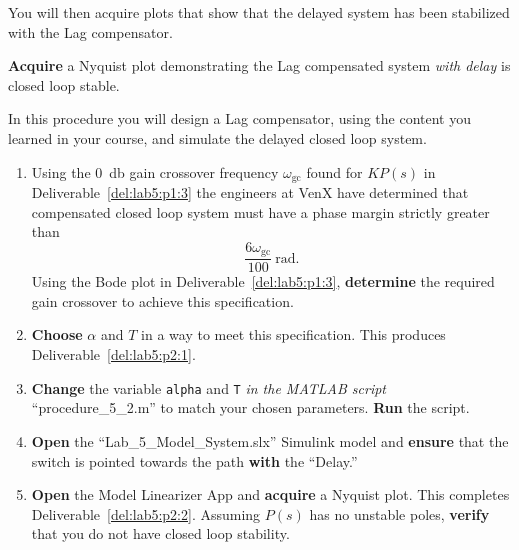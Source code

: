 %
You will then acquire plots that show that the delayed system has been stabilized with the Lag compensator.
%
\begin{deliverable}[label={del:lab5:p2:2}]
  \textbf{Acquire} a Nyquist plot demonstrating the Lag compensated system \emph{with delay} is closed loop stable.
\end{deliverable}
%
\begin{procedure}[label={proc:lab5:2}]
  In this procedure you will design a Lag compensator, using the content you learned in your course, and simulate the delayed closed loop system.
  \begin{enumerate}[label={(\arabic*)}]
    \item{%
      Using the \SI{0}{\decibel} gain crossover frequency \(\omega_\mathrm{gc}\) found for \(K P(s)\) in Deliverable~\ref{del:lab5:p1:3} the engineers at VenX have determined that compensated closed loop system must have a phase margin strictly greater than
      \[
        \frac{6\omega_\mathrm{gc}}{100}~\mathrm{rad}.
      \]
      Using the Bode plot in Deliverable~\ref{del:lab5:p1:3}, \textbf{determine} the required gain crossover to achieve this specification.
    }
    \item{%
      \textbf{Choose} \(\alpha\) and \(T\) in a way to meet this specification.
      This produces Deliverable~\ref{del:lab5:p2:1}.
    }
    \item{%
      \textbf{Change} the variable \texttt{alpha} and \texttt{T} \emph{in the MATLAB script} ``procedure\_5\_2.m'' to match your chosen parameters.
      \textbf{Run} the script.
    }
    \item{%
      \textbf{Open} the ``Lab\_5\_Model\_System.slx'' Simulink model and \textbf{ensure} that the switch is pointed towards the path \textbf{with} the ``Delay.''
    }
    \item{%
      \textbf{Open} the Model Linearizer App and \textbf{acquire} a Nyquist plot.
      This completes Deliverable~\ref{del:lab5:p2:2}.
      Assuming \(P(s)\) has no unstable poles, \textbf{verify} that you do not have closed loop stability.
    }
  \end{enumerate}
\end{procedure}


